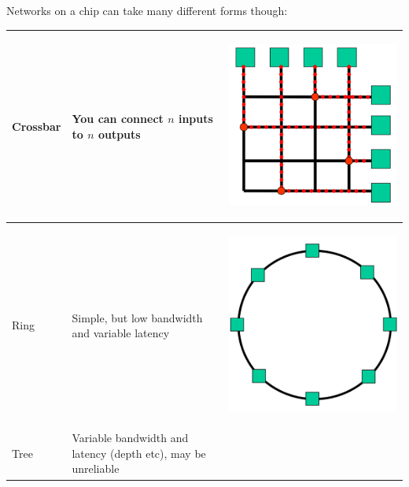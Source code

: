 Networks on a chip can take many different forms though:

\begin{center}
  \begin{tabular}{| m{2cm} | m{5cm} | c |}
    \hline
    Crossbar & You can connect $n$ inputs to $n$ outputs & 
    \begin{minipage}{.3\textwidth}
      \begin{center}
        \includegraphics[width=0.5\linewidth]{images/crossbar}
      \end{center}
    \end{minipage} \\ \hline
    Ring & Simple, but low bandwidth and variable latency & 
    \begin{minipage}{.3\textwidth}
      \begin{center}
        \includegraphics[width=0.5\linewidth]{images/ring}
      \end{center}
    \end{minipage} \\ \hline
    Tree & Variable bandwidth and latency (depth etc), may be unreliable & 
    \begin{minipage}{.3\textwidth}
      \begin{center}

\end{center}
\end{minipage}
\end{tabular}
\end{center}
